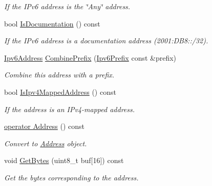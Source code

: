 \begin{DoxyCompactItemize}
\begin{DoxyCompactList}\small\item\em If the I\+Pv6 address is the \char`\"{}\+Any\char`\"{} address. \end{DoxyCompactList}\item 
bool \hyperlink{classns3_1_1Ipv6Address_a9ccdedd4e4471bcc676564e2599eb955}{Is\+Documentation} () const 
\begin{DoxyCompactList}\small\item\em If the I\+Pv6 address is a documentation address (2001\+:D\+B8\+:\+:/32). \end{DoxyCompactList}\item 
\hyperlink{classns3_1_1Ipv6Address}{Ipv6\+Address} \hyperlink{classns3_1_1Ipv6Address_a91f6e8c6a3020d592f45b8e33a79070f}{Combine\+Prefix} (\hyperlink{classns3_1_1Ipv6Prefix}{Ipv6\+Prefix} const \&prefix)
\begin{DoxyCompactList}\small\item\em Combine this address with a prefix. \end{DoxyCompactList}\item 
bool \hyperlink{classns3_1_1Ipv6Address_a2317c35991225feaaaa6fbd5d0711a65}{Is\+Ipv4\+Mapped\+Address} () const 
\begin{DoxyCompactList}\small\item\em If the address is an I\+Pv4-\/mapped address. \end{DoxyCompactList}\item 
\hyperlink{classns3_1_1Ipv6Address_acd53adfec6f746fd3875124ecd6f3b57}{operator Address} () const 
\begin{DoxyCompactList}\small\item\em Convert to \hyperlink{classns3_1_1Address}{Address} object. \end{DoxyCompactList}\item 
void \hyperlink{classns3_1_1Ipv6Address_ab0584d5f11901b3a560be98afe358648}{Get\+Bytes} (uint8\+\_\+t buf\mbox{[}16\mbox{]}) const 
\begin{DoxyCompactList}\small\item\em Get the bytes corresponding to the address. \end{DoxyCompactList}\end{DoxyCompactItemize}

